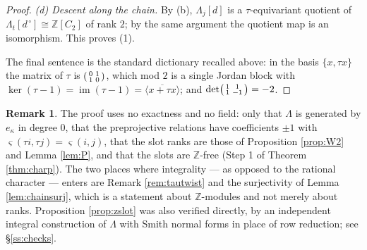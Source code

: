 \documentclass[reqno]{amsart}
\theoremstyle{plain}
\theoremstyle{definition}
\newtheorem{remark}[theorem]{Remark}
\DeclareMathOperator{\im}{im}
\newcommand{\ka}{\kappa}
\begin{document}
\begin{proof}
\emph{(d) Descent along the chain.}  By (b), $\Lambda_j[d]$ is a
$\tau$-equivariant quotient of $\Lambda_t[d^{\,\circ}]\cong\mathbb{Z}[C_2]$ of
rank $2$; by the same argument the quotient map is an isomorphism.  This
proves (1).

The final sentence is the standard dictionary recalled above: in the basis
$\{x,\tau x\}$ the matrix of $\tau$ is $\begin{psmallmatrix}0&1\\1&0
\end{psmallmatrix}$, which mod $2$ is a single Jordan block with
$\ker(\tau-1)=\im(\tau-1)=\langle\overline{x+\tau x}\rangle$; and
$\det\begin{psmallmatrix}1&1\\1&-1\end{psmallmatrix}=-2$.
\end{proof}

\begin{remark}
The proof uses no exactness and no field: only that $\Lambda$ is generated by
$e_\ka$ in degree $0$, that the preprojective relations have coefficients
$\pm1$ with $\varsigma(\tau i,\tau j)=\varsigma(i,j)$, that the slot ranks are
those of Proposition \ref{prop:W2} and Lemma \ref{lem:P}, and that the slots
are $\mathbb{Z}$-free (Step 1 of Theorem \ref{thm:charp}).  The two places
where integrality --- as opposed to the rational character --- enters are
Remark \ref{rem:tautwist} and the surjectivity of Lemma \ref{lem:chainsurj},
which is a statement about $\mathbb{Z}$-modules and not merely about ranks.
Proposition \ref{prop:zslot} was also verified directly, by an independent
integral construction of $\Lambda$ with Smith normal forms in place of row
reduction; see \S\ref{ss:checks}.
\end{remark}
\end{document}
